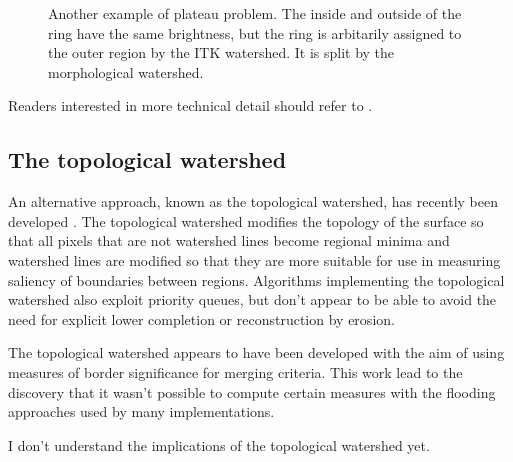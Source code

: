 \documentclass{InsightArticle}
\begin{document}
\begin{figure}[htbp]
\begin{center}
\caption{Another example of plateau problem. The inside and outside of the ring have the same brightness, but the ring is arbitarily assigned to the outer region by the ITK watershed. It is split by the morphological watershed.\label{fig:circle}}
\end{center}
\end{figure}


Readers interested in more technical detail should refer to
\cite{Roerdink2000a,Meijster2004a}.

\subsection{The topological watershed}
An alternative approach, known as the topological watershed, has
recently been developed \cite{topologicalWatershed}. The topological watershed modifies
the topology of the surface so that all pixels that are not watershed
lines become regional minima and watershed lines are modified so that
they are more suitable for use in measuring saliency of boundaries
between regions. Algorithms implementing the topological watershed
also exploit priority queues, but don't appear to be able to avoid the
need for explicit lower completion or reconstruction by erosion.

The topological watershed appears to have been developed with the aim
of using measures of border significance for merging criteria. This
work lead to the discovery that it wasn't possible to compute certain
measures with the flooding approaches used by many implementations.

I don't understand the implications of the topological watershed yet.
\end{document}
